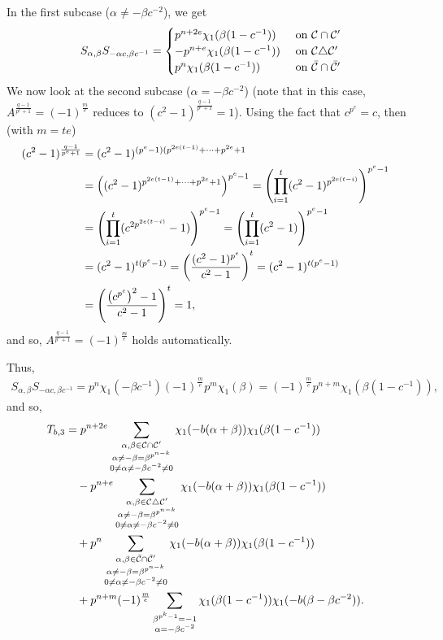 \documentclass[11pt]{article}
\def\cC{{\mathcal C}}
\def\\{\cr}
\begin{document}
In the first subcase ($\alpha\neq -\beta c^{-2}$), we get
\[
S_{\alpha,\beta}S_{-\alpha c,\beta c^{-1}} = 
\begin{cases}
p^{n+2e}  \chi_1(\beta(1-c^{-1})) &\text{ on } \cC\cap \cC'\\
-p^{n+e}  \chi_1(\beta(1-c^{-1})) &\text{ on } \cC\triangle\cC'\\
p^{n}  \chi_1(\beta(1-c^{-1})) &\text{ on } \bar\cC\cap\bar\cC'
\end{cases}
\]
We now look at the second subcase ($\alpha=-\beta c^{-2}$) (note that in this case,   $A^{\frac{q-1}{p^e+1}}=(-1)^{\frac{m}{e}}$ reduces to $(c^2-1)^{\frac{q-1}{p^e+1}}=1$).
Using the fact that $c^{p^e}=c$, then (with $m=te$)
\begin{align*}
(c^2-1)^{\frac{q-1}{p^e+1}}&=(c^2-1)^{(p^e-1)(p^{2e(t-1)}+\cdots+p^{2e}+1}\\
&= \left((c^2-1)^{p^{2e(t-1)}+\cdots+p^{2e}+1}\right)^{p^e-1}= \left(\prod_{i=1}^t (c^2-1)^{p^{2e(t-i)}}\right)^{p^e-1}\\
&= \left(\prod_{i=1}^t (c^{2p^{2e(t-i)}}-1)\right)^{p^e-1}= \left(\prod_{i=1}^t (c^{2}-1)\right)^{p^e-1}\\
&=(c^2-1)^{t(p^e-1)}=\left(\frac{(c^2-1)^{p^e}}{c^2-1} \right)^t=(c^2-1)^{t(p^e-1)}\\
&=\left(\frac{\left(c^{p^e}\right)^2-1}{c^2-1} \right)^t=1,
\end{align*}
and so, $A^{\frac{q-1}{p^e+1}}=(-1)^{\frac{m}{e}}$ holds automatically.

Thus,
\allowdisplaybreaks
\begin{align*}
S_{\alpha,\beta}S_{-\alpha c,\beta c^{-1}} =p^{n}\chi_1\left(-\beta c^{-1}\right)
(-1)^{\frac{m}{e}} p^m \chi_1(\beta) 
= 
(-1)^{\frac{m}{e}} p^{n+m}\chi_1(\beta(1-c^{-1})),
\end{align*}
and so,
\allowdisplaybreaks
\begin{align*}
T_{b,3}&=p^{n+2e} \sum_{\substack{\alpha,\beta\in\cC\cap \cC'\\ \alpha\neq -\beta=\beta^{p^{n-k}}\\ 0\neq \alpha \neq -\beta c^{-2}\neq 0 }}   \chi_1(-b(\alpha+\beta)) \chi_1(\beta(1-c^{-1}))\\
&\quad -p^{n+e}\sum_{\substack{\alpha,\beta\in\cC\triangle \cC'\\ \alpha\neq -\beta=\beta^{p^{n-k}}\\ 0\neq \alpha \neq -\beta c^{-2}\neq 0 }}  \chi_1(-b(\alpha+\beta)) \chi_1(\beta(1-c^{-1}))\\
&\quad+p^n\sum_{\substack{\alpha,\beta\in\bar \cC\cap \bar\cC'\\ \alpha\neq -\beta=\beta^{p^{n-k}}\\ 0\neq \alpha \neq -\beta c^{-2}\neq 0 }}   \chi_1(-b(\alpha+\beta)) \chi_1(\beta(1-c^{-1}))
\\
&\quad +p^{n+m}(-1)^{\frac{m}{e}}  \sum_{\substack{\beta^{p^k-1}=-1\\ 
\alpha=-\beta c^{-2} }} \chi_1(\beta(1-c^{-1}))\chi_1(-b(\beta-\beta c^{-2})).
\end{align*}
\end{document}
